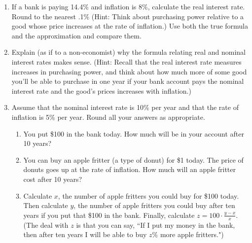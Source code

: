 \begin{enumerate}


\item If a bank is paying 14.4\% and inflation is 8\%, calculate the real interest rate. Round to the nearest .1\% (Hint: Think about purchasing power relative to a good whose price increases at the rate of inflation.) Use both the true formula and the approximation and compare them.



\item Explain (as if to a non-economist) why the formula relating real and nominal interest rates makes sense. (Hint: Recall that the real interest rate measures increases in purchasing power, and think about how much more of some good you'll be able to purchase in one year if your bank account pays the nominal interest rate and the good's prices increases with inflation.)



\item Assume that the nominal interest rate is 10\% per year and that the rate of inflation is 5\% per year. Round all your answers as appropriate.

    \begin{enumerate}

    \item You put \$100 in the bank today. How much will be in your account after 10 years?

    \item You can buy an apple fritter (a type of donut) for \$1 today. The price of donuts goes up at the rate of inflation. How much will an apple fritter cost after 10 years?

    \item \label{fritter} Calculate $x$, the number of apple fritters you could buy for \$100 today. Then calculate $y$, the number of apple fritters you could buy after ten years if you put that \$100 in the bank. Finally, calculate $\displaystyle z=100\cdot \frac{y-x}{x}$. (The deal with $z$ is that you can say, ``If I put my money in the bank, then after ten years I will be able to buy $z\%$ more apple fritters.")


\end{enumerate}
\end{enumerate}
